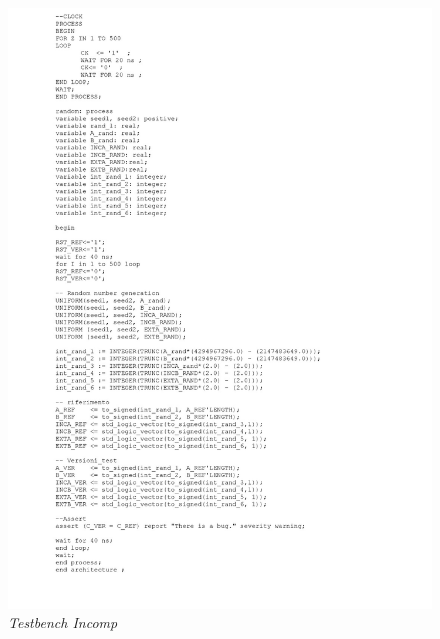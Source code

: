 \begin{figure}[!htb]
	\centering
	\includegraphics[scale=0.25]{immagini/testbench_vhdl2}
	\caption{\textit{Testbench Incomp}}
	\label{testbench_vhdl2}
\end{figure}
\begin{quotation}
\end{quotation}
